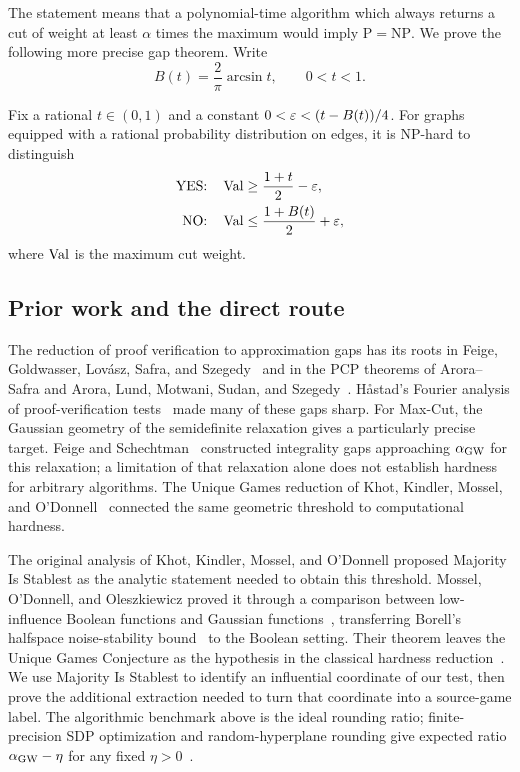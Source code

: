 The statement means that a polynomial-time algorithm which always returns a
cut of weight at least $\alpha$ times the maximum would imply
$\mathrm P=\mathrm{NP}$. We prove the following more precise gap theorem.
Write
\begin{equation}\label{eq:B}
 B(t)=\frac{2}{\pi}\arcsin t,\qquad 0<t<1.
\end{equation}

\begin{theorem}\label{thm:gap}
Fix a rational $t\in(0,1)$ and a constant
$0<\varepsilon<(t-B(t))/4$. For graphs equipped with a rational probability
distribution on edges, it is NP-hard to distinguish
\begin{align*}
 \textnormal{YES:}\quad&\operatorname{Val}\ge\frac{1+t}{2}-\varepsilon,\\
 \textnormal{NO:}\quad&\operatorname{Val}\le\frac{1+B(t)}{2}+\varepsilon,
\end{align*}
where $\operatorname{Val}$ is the maximum cut weight.
\end{theorem}

\subsection*{Prior work and the direct route}

The reduction of proof verification to approximation gaps has its roots in
Feige, Goldwasser, Lov\'asz, Safra, and Szegedy~\cite{FGLSS96} and in the
PCP theorems of Arora--Safra and Arora, Lund, Motwani, Sudan, and
Szegedy~\cite{AroraSafra98,ALMSS98}. H\aa stad's Fourier analysis of
proof-verification tests~\cite{Hastad01} made many of these gaps sharp.
For Max-Cut, the Gaussian geometry of the semidefinite relaxation gives
a particularly precise target. Feige and Schechtman~\cite{FS02}
constructed integrality gaps approaching $\alpha_{\mathrm{GW}}$ for this relaxation;
a limitation of that relaxation alone does not establish hardness for
arbitrary algorithms. The Unique Games reduction of
Khot, Kindler, Mossel, and O'Donnell~\cite{KKMO07} connected the same
geometric threshold to computational hardness.

The original analysis of Khot, Kindler, Mossel, and O'Donnell proposed
Majority Is Stablest as the analytic statement needed to obtain this
threshold. Mossel, O'Donnell, and Oleszkiewicz proved it through a
comparison between low-influence Boolean functions and Gaussian
functions~\cite{MOO10}, transferring Borell's halfspace noise-stability
bound~\cite{Borell85} to the Boolean setting. Their theorem leaves the
Unique Games Conjecture as the hypothesis in the classical hardness
reduction~\cite[Corollary~2.12]{MOO10}. We use Majority Is Stablest to
identify an influential coordinate of our test, then prove the additional
extraction needed to turn that coordinate into a source-game label.
The algorithmic benchmark above is the ideal rounding ratio;
finite-precision SDP optimization and random-hyperplane rounding give
expected ratio $\alpha_{\mathrm{GW}}-\eta$ for any fixed $\eta>0$~\cite[Section~2]{GW95}.

